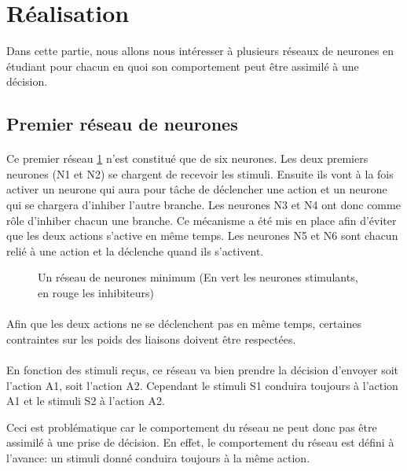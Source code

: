 \section{Réalisation}
Dans cette partie, nous allons nous intéresser à plusieurs réseaux de neurones
en étudiant pour chacun en quoi son comportement peut être assimilé à une
décision.


\subsection{Premier réseau de neurones}
\paragraph{}
Ce premier réseau \ref{reseau1} n'est constitué que de six neurones. Les deux
premiers neurones (N1 et N2) se chargent de recevoir les stimuli. Ensuite ils
vont à la fois activer un neurone qui aura pour tâche de déclencher une
action et un neurone qui se chargera d'inhiber l'autre branche. Les neurones
N3 et N4 ont donc comme rôle d'inhiber chacun une branche. Ce mécanisme a été
mis en place afin d'éviter que les deux actions s'active en même temps. 
Les neurones N5 et N6 sont chacun relié à une action et la déclenche quand
ils s'activent.

\begin{figure}[!h]
  \begin{center}
    
  \end{center}
  \caption{Un réseau de neurones minimum (En vert les neurones stimulants, en rouge les inhibiteurs)}
  \label{reseau1}
\end{figure}

\paragraph{}
Afin que les deux actions ne se déclenchent pas en même temps, certaines
contraintes sur les poids des liaisons doivent être respectées. 

\paragraph{}
En fonction des stimuli reçus, ce réseau va bien prendre la décision
d'envoyer soit l'action A1, soit l'action A2. Cependant le
stimuli S1 conduira toujours à l'action A1 et le stimuli S2 à
l'action A2.

Ceci est problématique car le comportement du réseau ne peut donc pas
être assimilé à une prise de décision. En effet, le comportement du réseau
est défini à l'avance: un stimuli donné conduira toujours à la même action.

